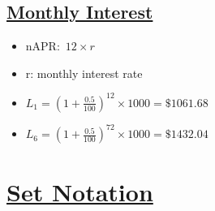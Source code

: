 \documentclass{article}
\begin{document}
\subsection{\underline{Monthly Interest}}
\begin{itemize}
  \item nAPR:\ $ 12 \times r$
  \item r: monthly interest rate
  \item $L_{1} = \left(1 + \frac{0.5}{100}\right)^{12} \times 1000 = \$1061.68$
  \item $L_{6} = \left(1 + \frac{0.5}{100}\right)^{72} \times 1000 = \$1432.04$
\end{itemize}
\section{\underline{Set Notation}}
\end{document}
